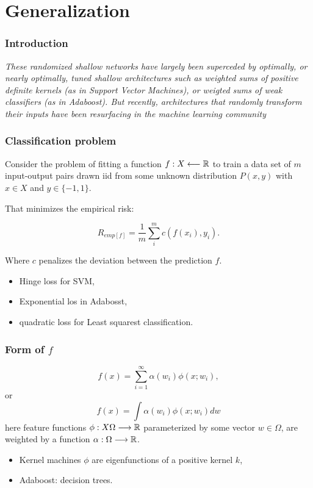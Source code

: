 \section{Generalization}

\begin{frame}
  \frametitle{Introduction}

 \textit{These randomized shallow networks have largely been superceded by optimally, or nearly
 optimally, tuned shallow architectures such as weighted sums of positive definite kernels (as in
 Support Vector Machines), or weigted sums of weak classifiers (as in Adaboost). But recently,
 architectures that randomly transform their inputs have been resurfacing in the machine learning
 community }

\end{frame}


\begin{frame}
  \frametitle{Classification problem}

  Consider the problem of fitting a function 
  $f: X \longleftarrow \mathbb{R}$ to train a data set of $m$ input-output pairs
  drawn iid from some unknown distribution $P(x,y)$ with $x \in X$ and 
  $y \in \{-1,1\}$.

  That minimizes the empirical risk: 

  \begin{equation}
    R_{emp[f]}
    = 
    \frac{1}{m} 
    \sum^m_i c\left( f(x_i), y_i\right). 
  \end{equation}

  Where $c$ penalizes the deviation between the prediction $f$. 

  \begin{itemize}
    \item Hinge loss for SVM,
    \item Exponential los in Adabosst, 
    \item quadratic loss for Least squarest classification. 
  \end{itemize}
\end{frame}

\begin{frame}
  \frametitle{Form of $f$}

  \begin{equation}
    f(x)
    =
    \sum_{i = 1} ^\infty
      \alpha(w_i) \phi(x; w_i),
  \end{equation}
  or
  \begin{equation}
    f(x)
    =
    \int
      \alpha(w_i) \phi(x; w_i) dw
  \end{equation}
  here feature functions $\phi: X \Omega \longrightarrow \mathbb{R}$
  parameterized by some vector $w \in \Omega$,   are weighted by a function 
  $\alpha: \Omega \longrightarrow \mathbb{R}$. 

  \begin{itemize}
    \item Kernel machines $\phi$ are eigenfunctions of a positive kernel $k$, 
    \item Adaboost: decision trees. 
  \end{itemize}

\end{frame}

